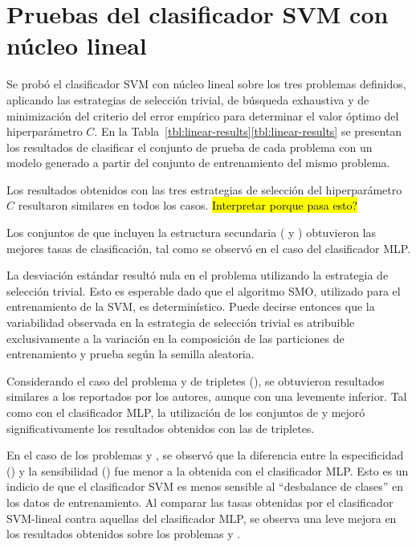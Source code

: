 %
%
%
\section{Pruebas del clasificador SVM con núcleo lineal}
%
Se probó el clasificador SVM con núcleo lineal sobre los tres
problemas definidos, aplicando las estrategias de selección trivial,
de búsqueda exhaustiva y de minimización del criterio del error
empírico para determinar el valor óptimo del hiperparámetro $C$.
En la \iflatexml{}Tabla~\ref{tbl:linear-results}\else\autoref{tbl:linear-results}\fi{}
se presentan los resultados de clasificar el conjunto de prueba de
cada problema con un modelo generado a partir del conjunto de
entrenamiento del mismo problema.

Los resultados obtenidos con las tres estrategias de selección del
hiperparámetro $C$ resultaron similares en todos los casos.
\hl{Interpretar porque pasa esto?}

Los conjuntos de  que incluyen la estructura secundaria
( y ) obtuvieron las mejores tasas de clasificación,
tal como se observó en el caso del clasificador MLP.

La desviación estándar resultó nula en el problema \prob{\tripletsvm}
utilizando la estrategia de selección trivial.
Esto es esperable dado que el algoritmo SMO, utilizado para el
entrenamiento de la SVM, es determinístico.
Puede decirse entonces que la variabilidad observada en la estrategia
de selección trivial es atribuible exclusivamente a la variación en la
composición de las particiones de entrenamiento y prueba según la
semilla aleatoria.

Considerando el caso del problema \prob\tripletsvm{} y  de
tripletes (), se obtuvieron resultados similares a los
reportados por los autores, aunque con una \SP{} levemente inferior.
Tal como con el clasificador MLP, la utilización de los conjuntos de
  y  mejoró significativamente los
resultados obtenidos con las  de tripletes.

En el caso de los problemas \prob\mipred{} y \prob\micropred{}, se
observó que la diferencia entre la especificidad (\SP) y la
sensibilidad (\SE) fue menor a la obtenida con el clasificador MLP.
Esto es un indicio de que el clasificador SVM es menos sensible al
``desbalance de clases'' en los datos de entrenamiento.
Al comparar las tasas obtenidas por el clasificador SVM-lineal contra
aquellas del clasificador MLP, se observa una leve mejora en los
resultados obtenidos sobre los problemas \prob\mipred{} y
\prob\micropred{}.
